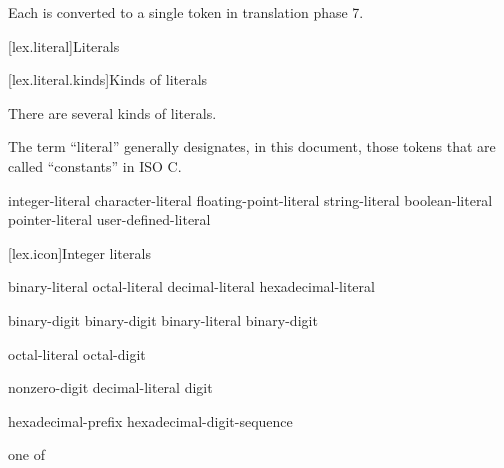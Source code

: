 Each  is converted to a single token
in translation phase 7.%
%

[lex.literal]{Literals}%

[lex.literal.kinds]{Kinds of literals}

\pnum
{}%
%
There are several kinds of literals.
\begin{footnote}
The term ``literal'' generally designates, in this
document, those tokens that are called ``constants'' in
ISO C.
\end{footnote}

\begin{bnf}
\br
    integer-literal\br
    character-literal\br
    floating-point-literal\br
    string-literal\br
    boolean-literal\br
    pointer-literal\br
    user-defined-literal
\end{bnf}

[lex.icon]{Integer literals}

%
\begin{bnf}
\br
    binary-literal \br
    octal-literal \br
    decimal-literal \br
    hexadecimal-literal 
\end{bnf}

\begin{bnf}
\br
     binary-digit\br
     binary-digit\br
    binary-literal  binary-digit
\end{bnf}

\begin{bnf}
\br
    \br
    octal-literal  octal-digit
\end{bnf}

\begin{bnf}
\br
    nonzero-digit\br
    decimal-literal  digit
\end{bnf}

\begin{bnf}
\br
    hexadecimal-prefix hexadecimal-digit-sequence
\end{bnf}

\begin{bnf}
 \textnormal{one of}\br
\end{bnf}

